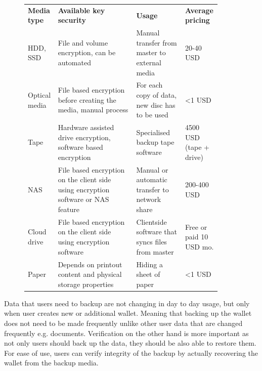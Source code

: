 \documentclass[
  printed, %
  table,   %
  nolof,     %
  nolot,     %
           oneside, color
]{fithesis3}
\begin{document}
\begin{figure}[H]
\centering
\begin{tabular}{p{0.1\linewidth}p{0.4\linewidth}p{0.25\linewidth}p{0.15\linewidth}}
\textbf{Media type} & \textbf{Available key security}                                    & \textbf{Usage}                                   & \textbf{Average pricing}      \\
HDD, SSD            & File and volume encryption, can be automated                       & Manual transfer from master to external media    & 20-40 USD                              \\
Optical media       & File based encryption before creating the media, manual process            & For each copy of data, new disc has to be used   & \textless{}1 USD                       \\
Tape                & Hardware assisted drive encryption, software based encryption       & Specialised backup tape software                 & 4500 USD (tape + drive) \\
NAS                 & File based encryption on the client side using encryption software or NAS feature & Manual or automatic transfer to network share    & 200-400 USD                            \\
Cloud drive       & File based encryption on the client side using encryption software & Clientside software that syncs files from master & Free or paid 10 USD mo.                      \\
Paper               & Depends on printout content and physical storage properties        & Hiding a sheet of paper                          & \textless{}1 USD                       \\

\end{tabular}


\label{table:secure-storage}
\end{figure}

Data that users need to backup are not changing in day to day usage, but only when user creates new or additional wallet. Meaning that backing up the wallet does not need to be made frequently unlike other user data that are changed frequently e.g. documents. Verification on the other hand is more important as not only users should back up the data, they should be also able to restore them. For ease of use, users can verify integrity of the backup by actually recovering the wallet from the backup media.
\end{document}
